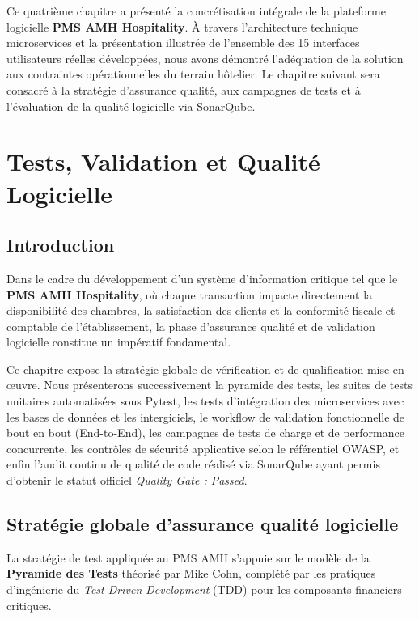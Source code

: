\documentclass[12pt,a4paper,oneside]{report}
\begin{document}
Ce quatrième chapitre a présenté la concrétisation intégrale de la plateforme logicielle \textbf{PMS AMH Hospitality}. À travers l'architecture technique microservices et la présentation illustrée de l'ensemble des 15 interfaces utilisateurs réelles développées, nous avons démontré l'adéquation de la solution aux contraintes opérationnelles du terrain hôtelier. Le chapitre suivant sera consacré à la stratégie d'assurance qualité, aux campagnes de tests et à l'évaluation de la qualité logicielle via SonarQube.

\chapter{Tests, Validation et Qualité Logicielle}
\label{chap:tests}

\section{Introduction}

Dans le cadre du développement d'un système d'information critique tel que le \textbf{PMS AMH Hospitality}, où chaque transaction impacte directement la disponibilité des chambres, la satisfaction des clients et la conformité fiscale et comptable de l'établissement, la phase d'assurance qualité et de validation logicielle constitue un impératif fondamental.

Ce chapitre expose la stratégie globale de vérification et de qualification mise en œuvre. Nous présenterons successivement la pyramide des tests, les suites de tests unitaires automatisées sous Pytest, les tests d'intégration des microservices avec les bases de données et les intergiciels, le workflow de validation fonctionnelle de bout en bout (End-to-End), les campagnes de tests de charge et de performance concurrente, les contrôles de sécurité applicative selon le référentiel OWASP, et enfin l'audit continu de qualité de code réalisé via SonarQube ayant permis d'obtenir le statut officiel \textit{Quality Gate : Passed}.

\section{Stratégie globale d'assurance qualité logicielle}

La stratégie de test appliquée au PMS AMH s'appuie sur le modèle de la \textbf{Pyramide des Tests} théorisé par Mike Cohn, complété par les pratiques d'ingénierie du \textit{Test-Driven Development} (TDD) pour les composants financiers critiques.
\end{document}
